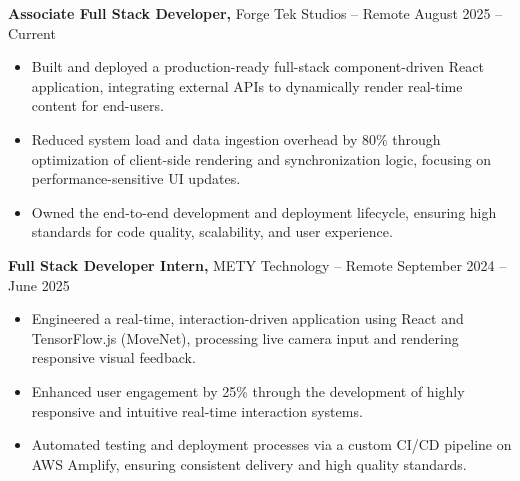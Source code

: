\documentclass[11pt]{article}       %
\begin{document}
\textbf{Associate Full Stack Developer,} {Forge Tek Studios} -- Remote \hfill August 2025 -- Current 
\vspace{-9pt}
\begin{itemize}
  \item Built and deployed a production-ready full-stack component-driven React application, integrating external APIs to dynamically render real-time content for end-users.
  \item Reduced system load and data ingestion overhead by 80\% through optimization of client-side rendering and synchronization logic, focusing on performance-sensitive UI updates.
  \item Owned the end-to-end development and deployment lifecycle, ensuring high standards for code quality, scalability, and user experience.
\end{itemize}

\textbf{Full Stack Developer Intern,} {METY Technology} -- Remote \hfill September 2024 -- June 2025 
\vspace{-9pt}
\begin{itemize}
  \item Engineered a real-time, interaction-driven application using React and TensorFlow.js (MoveNet), processing live camera input and rendering responsive visual feedback.
  \item Enhanced user engagement by 25\% through the development of highly responsive and intuitive real-time interaction systems.
  \item Automated testing and deployment processes via a custom CI/CD pipeline on AWS Amplify, ensuring consistent delivery and high quality standards.
\end{itemize}

\end{document}

